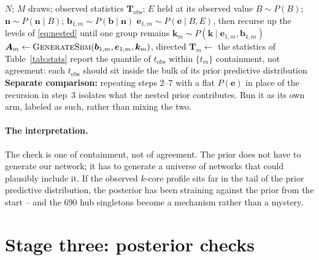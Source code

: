 \documentclass[11pt]{article}
\newcommand{\code}[1]{\texttt{\small #1}}
\begin{document}
\begin{algorithm}[!t]
\caption{Prior predictive check, simulating the hierarchy as fitted. Nothing
  here fits a model, so it needs no library: \code{generate_sbm} is a
  convenience, and the statistics are language-neutral.}
\label{alg:predictive}
\begin{algorithmic}[1]
\Require $N$; $M$ draws; observed statistics $\bm{T}_{\text{obs}}$; $E$ held at
  its observed value
  \State $B \sim P(B)$;\; $\bm{n} \sim P(\bm{n} \mid B)$;\;
    $\bm{b}_{1,m} \sim P(\bm{b} \mid \bm{n})$
  \State $\bm{e}_{1,m} \sim P(\bm{e} \mid B, E)$, then recurse up the levels
    of \eqref{eq:nested} until one group remains
  \State $\bm{k}_m \sim P(\bm{k} \mid \bm{e}_{1,m}, \bm{b}_{1,m})$
  \State $\bm{A}_m \gets \textsc{GenerateSbm}(\bm{b}_{1,m}, \bm{e}_{1,m},
    \bm{k}_m)$, directed
  \State $\bm{T}_m \gets$ the statistics of Table~\ref{tab:stats}
\EndFor
{}
  \State report the quantile of $t_{\text{obs}}$ within $\{t_m\}$
\EndFor
\Ensure containment, not agreement: each $t_{\text{obs}}$ should sit inside the
  bulk of its prior predictive distribution
\State \textbf{Separate comparison:} repeating steps 2--7 with a flat
  $P(\bm{e})$ in place of the recursion in step~3 isolates what the nested
  prior contributes. Run it as its own arm, labeled as such, rather than mixing the
  two.
\end{algorithmic}
\end{algorithm}

\paragraph{The interpretation.} The check is one of containment, not of
agreement. The prior does not have to generate our network; it has to generate a
universe of networks that could plausibly include it. If the observed $k$-core
profile sits far in the tail of the prior predictive distribution, the posterior
has been straining against the prior from the start -- and the 690 hub
singletons become a mechanism rather than a mystery.

\section{Stage three: posterior checks}
\label{sec:posterior}
\end{document}
